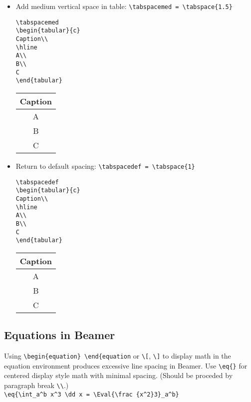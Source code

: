 \documentclass{article}
\begin{document}
\begin{itemize}
\item Add medium vertical space in table: \verb+\tabspacemed = \tabspace{1.5}+ 
\begin{multicols}{2}
\begin{verbatim}
\tabspacemed
\begin{tabular}{c}
Caption\\
\hline
A\\
B\\
C
\end{tabular}
\end{verbatim}
\columnbreak
\tabspacemed
\begin{tabular}{c}
Caption\\
\hline
A\\
B\\
C
\end{tabular}
\end{multicols}

\item Return to default spacing: \verb+\tabspacedef = \tabspace{1}+ 

\begin{multicols}{2}
\begin{verbatim}
\tabspacedef
\begin{tabular}{c}
Caption\\
\hline
A\\
B\\
C
\end{tabular}
\end{verbatim}
\columnbreak
\tabspacedef
\begin{tabular}{c}
Caption\\
\hline
A\\
B\\
C
\end{tabular}
\end{multicols}
\end{itemize}

\subsection*{Equations in Beamer}
Using \verb`\begin{equation} \end{equation` or \verb`\[`, \verb`\]` to display math in the equation environment produces excessive line spacing in Beamer. Use \verb`\eq{}` for centered display style math with minimal spacing. (Should be proceded by paragraph break \verb`\\`.)\\
\verb`\eq{\int_a^b x^3 \dd x = \Eval{\frac {x^2}3}_a^b}`\\
\end{document}

